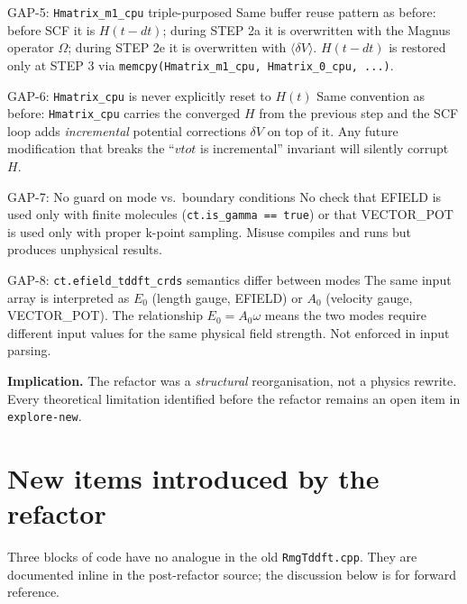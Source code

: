 \documentclass[11pt,letterpaper]{article}
\begin{document}
\begin{gapbox}{GAP-5: \texttt{Hmatrix\_m1\_cpu} triple-purposed}
Same buffer reuse pattern as before: before SCF it is $H(t-dt)$; during
STEP 2a it is overwritten with the Magnus operator $\Omega$; during STEP 2e
it is overwritten with $\langle \delta V \rangle$.  $H(t-dt)$ is restored
only at STEP 3 via \texttt{memcpy(Hmatrix\_m1\_cpu, Hmatrix\_0\_cpu, ...)}.
\end{gapbox}

\begin{gapbox}{GAP-6: \texttt{Hmatrix\_cpu} is never explicitly reset to $H(t)$}
Same convention as before: \texttt{Hmatrix\_cpu} carries the converged $H$
from the previous step and the SCF loop adds \emph{incremental} potential
corrections $\delta V$ on top of it.  Any future modification that breaks
the ``$vtot$ is incremental'' invariant will silently corrupt $H$.
\end{gapbox}

\begin{gapbox}{GAP-7: No guard on mode vs.~boundary conditions}
No check that EFIELD is used only with finite molecules
(\texttt{ct.is\_gamma == true}) or that VECTOR\_POT is used only with
proper k-point sampling.  Misuse compiles and runs but produces
unphysical results.
\end{gapbox}

\begin{gapbox}{GAP-8: \texttt{ct.efield\_tddft\_crds} semantics differ between modes}
The same input array is interpreted as $E_0$ (length gauge, EFIELD) or
$A_0$ (velocity gauge, VECTOR\_POT).  The relationship $E_0 = A_0 \omega$
means the two modes require different input values for the same physical
field strength.  Not enforced in input parsing.
\end{gapbox}

\noindent\textbf{Implication.}  The refactor was a \emph{structural}
reorganisation, not a physics rewrite.  Every theoretical limitation
identified before the refactor remains an open item in
\texttt{explore-new}.

\section{New items introduced by the refactor}
\label{sec:newitems}

Three blocks of code have no analogue in the old \texttt{RmgTddft.cpp}.
They are documented inline in the post-refactor source; the discussion
below is for forward reference.
\end{document}

